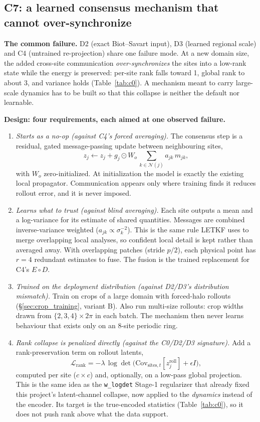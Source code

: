 \documentclass[11pt]{article}
\begin{document}
\subsection{C7: a learned consensus mechanism that cannot over-synchronize}
\label{sec:c7}

\textbf{The common failure.} D2 (exact Biot--Savart input), D3 (learned
regional scale) and C4 (untrained re-projection) share one failure mode.
At a new domain size, the added cross-site communication
\emph{over-synchronizes} the sites into a low-rank state while the energy
is preserved: per-site rank falls toward 1, global rank to about 3, and
variance holds (Table~\ref{tab:c0}). A mechanism meant to carry
large-scale dynamics has to be built so that this collapse is neither the
default nor learnable.

\textbf{Design: four requirements, each aimed at one observed failure.}
\begin{enumerate}[leftmargin=*]
\item \emph{Starts as a no-op (against C4's forced averaging).} The
  consensus step is a residual, gated message-passing update between
  neighbouring sites,
  \[
  z_j \leftarrow z_j + g_j \odot W_o\,\textstyle\sum_{k\in\mathcal N(j)} a_{jk}\,m_{jk},
  \]
  with $W_o$ zero-initialized. At initialization the model is exactly
  the existing local propagator. Communication appears only where
  training finds it reduces rollout error, and it is never imposed.
\item \emph{Learns what to trust (against blind averaging).} Each site
  outputs a mean and a log-variance for its estimate of shared quantities.
  Messages are combined inverse-variance weighted
  ($a_{jk}\propto\sigma_k^{-2}$). This is the same rule LETKF uses to
  merge overlapping local analyses, so confident local detail is kept
  rather than averaged away. With overlapping patches (stride $p/2$), each
  physical point has $r{=}4$ redundant estimates to fuse. The fusion is
  the trained replacement for C4's $E\circ D$.
\item \emph{Trained on the deployment distribution (against D2/D3's
  distribution mismatch).} Train on crops of a large domain with
  forced-halo rollouts (\S\ref{sec:crop_training}, variant B). Also run
  multi-size rollouts: crop widths drawn from
  $\{2,3,4\}\times2\pi$ in each batch. The mechanism then never learns
  behaviour that exists only on an 8-site periodic ring.
\item \emph{Rank collapse is penalized directly (against the C0/D2/D3
  signature).} Add a rank-preservation term on rollout latents,
  \[
  \mathcal L_{\mathrm{rank}} = -\lambda\,\log\det\!\big(\mathrm{Cov}_{\mathrm{sites},t}[z^{\mathrm{roll}}_j] + \epsilon I\big),
  \]
  computed per site ($c{\times}c$) and, optionally, on a low-pass global
  projection. This is the same idea as the \texttt{w\_logdet} Stage-1
  regularizer that already fixed this project's latent-channel collapse,
  now applied to the \emph{dynamics} instead of the encoder. Its target is
  the true-encoded statistics (Table~\ref{tab:c0}), so it does not push
  rank above what the data support.
\end{enumerate}
\end{document}
